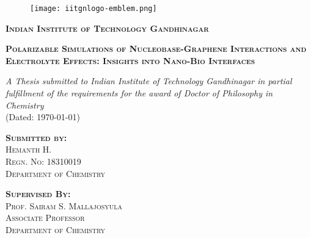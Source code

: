 \documentclass[11pt, twoside, oldfontcommands]{memoir}
\begin{document}
    \begin{titlingpage}
        \begin{figure}
            \centering
            \texttt{[image: iitgnlogo-emblem.png]}
        \end{figure}
        \vspace{2em}
        \begin{center}
            \large\scshape\textbf{Indian Institute of Technology Gandhinagar}
        \end{center}
        \vspace{3em}
        \begin{center}
            \Large\scshape\textbf{Polarizable Simulations of Nucleobase-Graphene Interactions and Electrolyte Effects: Insights into Nano-Bio Interfaces}
        \end{center}
        \vspace{1em}
        \begin{center}
            \textit{A Thesis submitted to Indian Institute of Technology Gandhinagar in partial fulfillment of the requirements for the award of Doctor of Philosophy in Chemistry}\\
            (Dated: \today)
        \end{center}
        \vspace{3em}
        \begin{center}
            \large\scshape
            \textbf{Submitted by:}\\
            Hemanth H.\\
            Regn. No: 18310019\\
            Department of Chemistry
        \end{center}
        \vspace{1em}
        \begin{center}
            \large\scshape
            \textbf{Supervised By:}\\
            Prof. Sairam S. Mallajosyula\\
            Associate Professor\\
            Department of Chemistry
        \end{center}
    \end{titlingpage}
    \frontmatter
    
    
    
    \listoffigures
    \newpage
    \listoftables
    \newpage
    \tableofcontents
    \mainmatter
    
    
    
    
    
    
    \backmatter
    \renewcommand{\thesection}{\Alph{section}}
    \begin{appendices}
        
        
        
        
    \end{appendices}
    \printbibliography
\end{document}
